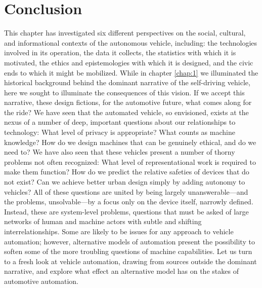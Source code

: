 \section{Conclusion}

This chapter has investigated six different perspectives on the
social, cultural, and informational contexts of the autonomous
vehicle, including:  the technologies involved in its operation, the
data it collects, the statistics with which it is motivated, the
ethics and epistemologies with which it is designed, and the civic
ends to which it might be mobilized. While in chapter \ref{chap:1} we
illuminated the historical background behind the dominant narrative of
the self-driving vehicle, here we sought to illuminate the
consequences of this vision. If we accept this narrative, these design
fictions, for the automotive future, what comes along for the ride? We
have seen that the automated vehicle, so envisioned, exists at the
nexus of a number of deep, important questions about our relationships
to technology: What level of privacy is appropriate? What counts as machine
knowledge? How do we design machines that can be genuinely ethical,
and do we need to? We have also seen that these vehicles present a
number of thorny problems not often recognized: What level of
representational work is required to make them function? How do we
predict the relative safeties of devices that do not exist? Can we
achieve better urban design simply by adding autonomy to vehicles?
All of these questions are united by being largely unanswerable---and
the problems, unsolvable---by a focus only on the device itself,
narrowly defined. Instead, these are system-level problems, questions
that must be asked of large networks of human and machine actors with
subtle and shifting interrelationships. Some are likely to be issues
for any approach to vehicle automation; however, alternative models of
automation present the possibility to soften some of the more
troubling questions of machine capabilities. Let us turn to a fresh look at
vehicle automation, drawing from sources outside the dominant
narrative, and explore what effect an alternative model has on the
stakes of automotive automation.

